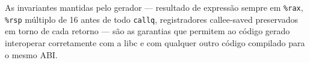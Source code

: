 As invariantes mantidas pelo gerador — resultado de expressão sempre em
\texttt{\%rax}, \texttt{\%rsp} múltiplo de 16 antes de todo \texttt{callq},
registradores callee-saved preservados em torno de cada retorno —
são as garantias que permitem ao código gerado interoperar corretamente
com a libc e com qualquer outro código compilado para o mesmo ABI.
